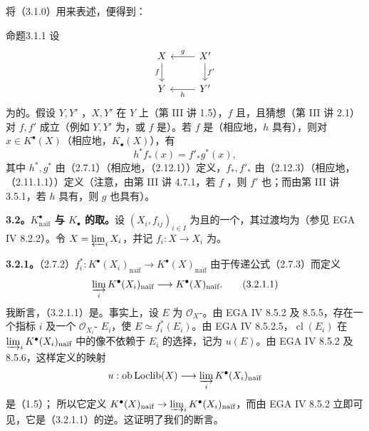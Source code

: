 将（3.1.0）用来表述，便得到：
\begin{SGAresult}{命题}{3.1.1}
设
\[\begin{tikzcd}
X\arrow[d,"f"']&X'\arrow[l,"g"']\arrow[d,"f'"]\\
Y&Y'\arrow[l,"h"]
\end{tikzcd}\]
为的。假设 $Y,Y'$ ，$X,Y'$ 在 $Y$ 上（第 III 讲 1.5），$f$ 且，且猜想（第 III 讲 2.1）对 $f,f'$ 成立（例如 $Y,Y'$ 为，或 $f$ 是）。若 $f$ 是（相应地，$h$ 具有），则对 $x\in K^\bullet(X)$（相应地，$K_\bullet(X)$），有
\[h^*f_*(x)=f'_*g^*(x),\]
其中 $h^*,g^*$ 由（2.7.1）（相应地，（2.12.1））定义，$f_*,f'_*$ 由（2.12.3）（相应地，（2.11.1.1））定义（注意，由第 III 讲 4.7.1，若 $f$ ，则 $f'$ 也；而由第 III 讲 3.5.1，若 $h$ 具有，则 $g$ 也具有）。
\end{SGAresult}

\textbf{3.2。$K^\bullet_{\text{naïf}}$ 与 $K_\bullet$ 的取。}设 $(X_i,f_{ij})_{i\in I}$ 为且的一个，其过渡均为（参见 EGA IV 8.2.2）。令 $X=\varprojlim_i X_i$，并记 $f_i:X\to X_i$ 为。

\textbf{3.2.1。}（2.7.2）$f_i^*:K^\bullet(X_i)_{\text{naïf}}\to K^\bullet(X)_{\text{naïf}}$ 由于传递公式（2.7.3）而定义
\[\varinjlim_i K^\bullet(X_i)_{\text{naïf}}\longrightarrow K^\bullet(X)_{\text{naïf}}.\tag{3.2.1.1}\]
我断言，（3.2.1.1）是。事实上，设 $E$ 为 $\mathscr O_X$-。由 EGA IV 8.5.2 及 8.5.5，存在一个指标 $i$ 及一个 $\mathscr O_{X_i}$- $E_i$，使 $E\simeq f_i^*(E_i)$。由 EGA IV 8.5.2.5，$\operatorname{cl}(E_i)$ 在 $\varinjlim_i K^\bullet(X_i)_{\text{naïf}}$ 中的像不依赖于 $E_i$ 的选择，记为 $u(E)$。由 EGA IV 8.5.2 及 8.5.6，这样定义的映射
\[u:\operatorname{ob}\operatorname{Loclib}(X)\longrightarrow\varinjlim_i K^\bullet(X_i)_{\text{naïf}}\]
是（1.5）；
所以它定义 $K^\bullet(X)_{\text{naïf}}\to\varinjlim_i K^\bullet(X_i)_{\text{naïf}}$，而由 EGA IV 8.5.2 立即可见，它是（3.2.1.1）的逆。这证明了我们的断言。


